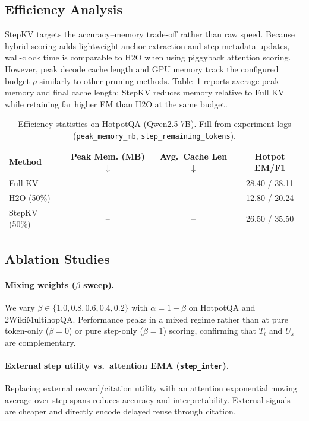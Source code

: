 \documentclass[11pt]{article}
\begin{document}
\subsection{Efficiency Analysis}

StepKV targets the accuracy--memory trade-off rather than raw speed.
Because hybrid scoring adds lightweight anchor extraction and step metadata updates, wall-clock time is comparable to H2O when using piggyback attention scoring.
However, peak decode cache length and GPU memory track the configured budget $\rho$ similarly to other pruning methods.
Table~\ref{tab:efficiency} reports average peak memory and final cache length; StepKV reduces memory relative to Full KV while retaining far higher EM than H2O at the same budget.

\begin{table}[t]
\centering
\setlength{\tabcolsep}{5pt}
\begin{tabular}{lccc}
\toprule
Method & Peak Mem. (MB) $\downarrow$ & Avg.\ Cache Len $\downarrow$ & Hotpot EM/F1 \\
\midrule
Full KV & -- & -- & 28.40 / 38.11 \\
H2O (50\%) & -- & -- & 12.80 / 20.24 \\
StepKV (50\%) & -- & -- & 26.50 / 35.50 \\
\bottomrule
\end{tabular}
\caption{Efficiency statistics on HotpotQA (Qwen2.5-7B). Fill from experiment logs (\texttt{peak\_memory\_mb}, \texttt{step\_remaining\_tokens}).}
\label{tab:efficiency}
\end{table}

\subsection{Ablation Studies}

\paragraph{Mixing weights ($\beta$ sweep).}
We vary $\beta\in\{1.0,0.8,0.6,0.4,0.2\}$ with $\alpha=1-\beta$ on HotpotQA and 2WikiMultihopQA.
Performance peaks in a mixed regime rather than at pure token-only ($\beta=0$) or pure step-only ($\beta=1$) scoring, confirming that $T_i$ and $U_s$ are complementary.

\paragraph{External step utility vs.\ attention EMA (\texttt{step\_inter}).}
Replacing external reward/citation utility with an attention exponential moving average over step spans reduces accuracy and interpretability.
External signals are cheaper and directly encode delayed reuse through citation.
\end{document}

